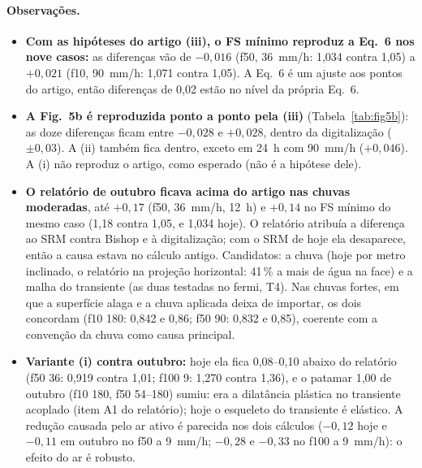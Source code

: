 \paragraph{Observações.}
\begin{itemize}
  \item \textbf{Com as hipóteses do artigo (iii), o FS mínimo reproduz a Eq.~6 nos nove casos:} as diferenças vão de
    $-0{,}016$ (f50, 36~mm/h: 1,034 contra 1,05) a $+0{,}021$ (f10, 90~mm/h: 1,071 contra 1,05). A Eq.~6 é um ajuste
    aos pontos do artigo, então diferenças de 0,02 estão no nível da própria Eq.~6.
  \item \textbf{A Fig.~5b é reproduzida ponto a ponto pela (iii)} (Tabela~\ref{tab:fig5b}): as doze diferenças ficam
    entre $-0{,}028$ e $+0{,}028$, dentro da digitalização ($\pm 0{,}03$). A (ii) também fica dentro, exceto em 24~h
    com 90~mm/h ($+0{,}046$). A (i) não reproduz o artigo, como esperado (não é a hipótese dele).
  \item \textbf{O relatório de outubro ficava acima do artigo nas chuvas moderadas}, até $+0{,}17$ (f50, 36~mm/h, 12~h)
    e $+0{,}14$ no FS mínimo do mesmo caso (1,18 contra 1,05, e 1,034 hoje). O relatório atribuía a diferença ao SRM
    contra Bishop e à digitalização; com o SRM de hoje ela desaparece, então a causa estava no cálculo antigo.
    Candidatos: a chuva (hoje por metro inclinado, o relatório na projeção horizontal: 41\,\% a mais de água na face) e
    a malha do transiente (as duas testadas no fermi, T4). Nas chuvas fortes, em que a superfície alaga e a chuva
    aplicada deixa de importar, os dois concordam (f10 180: 0,842 e 0,86; f50 90: 0,832 e 0,85), coerente com a
    convenção da chuva como causa principal.
  \item \textbf{Variante (i) contra outubro:} hoje ela fica 0,08--0,10 abaixo do relatório (f50 36: 0,919 contra 1,01;
    f100 9: 1,270 contra 1,36), e o patamar 1,00 de outubro (f10 180, f50 54--180) sumiu: era a dilatância plástica no
    transiente acoplado (item A1 do relatório); hoje o esqueleto do transiente é elástico. A redução causada pelo ar
    ativo é parecida nos dois cálculos ($-0{,}12$ hoje e $-0{,}11$ em outubro no f50 a 9~mm/h; $-0{,}28$ e $-0{,}33$ no
    f100 a 9~mm/h): o efeito do ar é robusto.
\end{itemize}
